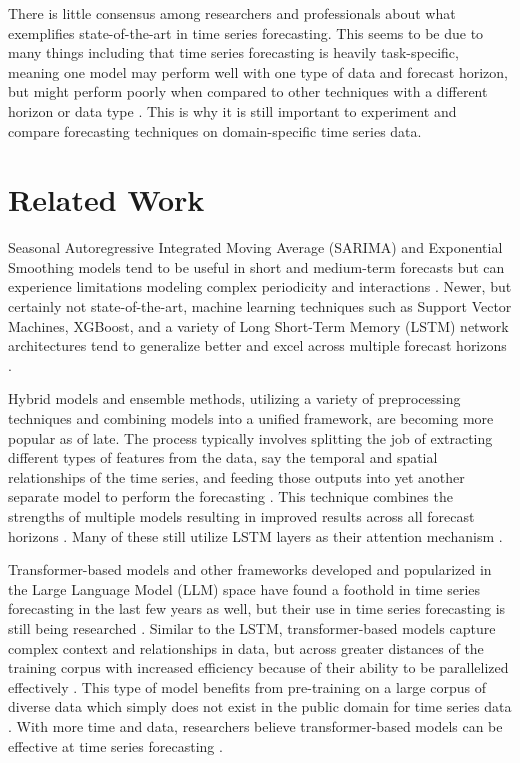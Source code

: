 \documentclass[sigconf]{acmart}
\begin{document}
There is little consensus among researchers and professionals about what exemplifies state-of-the-art in time series forecasting. This seems to be due to many things including that time series forecasting is heavily task-specific, meaning one model may perform well with one type of data and forecast horizon, but might perform poorly when compared to other techniques with a different horizon or data type \cite{Yue21}. This is why it is still important to experiment and compare forecasting techniques on domain-specific time series data.

\section{Related Work}
Seasonal Autoregressive Integrated Moving Average (SARIMA) and Exponential Smoothing models tend to be useful in short and medium-term forecasts but can experience limitations modeling complex periodicity and interactions \cite{Muzaffar19, Hopf23}. Newer, but certainly not state-of-the-art, machine learning techniques such as Support Vector Machines, XGBoost, and a variety of Long Short-Term Memory (LSTM) network architectures tend to generalize better and excel across multiple forecast horizons \cite{Sun22, Muzaffar19}.

Hybrid models and ensemble methods, utilizing a variety of preprocessing techniques and combining models into a unified framework, are becoming more popular as of late. The process typically involves splitting the job of extracting different types of features from the data, say the temporal and spatial relationships of the time series, and feeding those outputs into yet another separate model to perform the forecasting \cite{Hua23}. This technique combines the strengths of multiple models resulting in improved results across all forecast horizons \cite{Hua23, Hopf23}. Many of these still utilize LSTM layers as their attention mechanism \cite{Sun22}.

Transformer-based models and other frameworks developed and popularized in the Large Language Model (LLM) space have found a foothold in time series forecasting in the last few years as well, but their use in time series forecasting is still being researched \cite{Zeng22}. Similar to the LSTM, transformer-based models capture complex context and relationships in data, but across greater distances of the training corpus with increased efficiency because of their ability to be parallelized effectively \cite{Zheng24}. This type of model benefits from pre-training on a large corpus of diverse data which simply does not exist in the public domain for time series data \cite{Hug24}. With more time and data, researchers believe transformer-based models can be effective at time series forecasting \cite{Hug24, Zheng24}.
\end{document}

